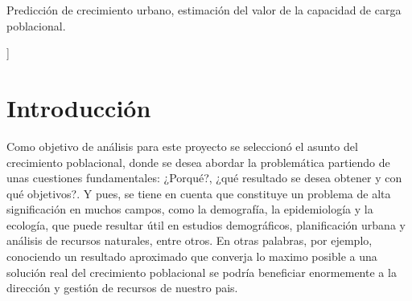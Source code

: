 \documentclass[a4paper,10pt,twocolumn]{article}
\begin{document}
\begin{topics}
	Predicción de crecimiento urbano, estimación del valor de la capacidad de carga poblacional.
\end{topics}


\vspace{0.8cm}
]



\section{Introducción}\label{sec:intro}
Como objetivo de análisis para este proyecto se seleccionó el asunto del 
crecimiento poblacional, donde se desea abordar la problemática partiendo de 
unas cuestiones fundamentales: ¿Porqué?, ¿qué resultado se desea obtener 
y con qué objetivos?. Y pues, se tiene en cuenta que constituye un problema 
de alta significación en muchos campos, como la demografía, la epidemiología 
y la ecología, que puede resultar útil en estudios demográficos, planificación 
urbana y análisis de recursos naturales, entre otros. En otras palabras, por 
ejemplo, conociendo un resultado aproximado que converja lo maximo posible a una 
solución real del crecimiento poblacional se podría beneficiar enormemente a la 
dirección y gestión de recursos de nuestro pais.




\end{document}
